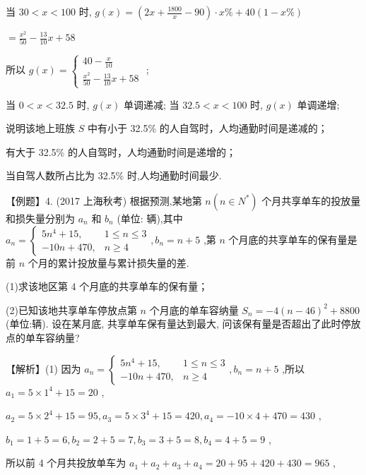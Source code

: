 \documentclass[10pt]{article}
\begin{document}
当 \({30} < x < {100}\) 时, \(g\left( x\right)  = \left( {{2x} + \frac{1800}{x} - {90}}\right)  \cdot  x\%  + {40}\left( {1 - x\% }\right)\)

\(= \frac{{x}^{2}}{50} - \frac{13}{10}x + {58}\)

所以 \(g\left( x\right)  = \left\{  \begin{array}{l} {40} - \frac{x}{10} \\  \frac{{x}^{2}}{50} - \frac{13}{10}x + {58} \end{array}\right.\) ;

当 \(0 < x < {32.5}\) 时, \(g\left( x\right)\) 单调递减; 当 \({32.5} < x < {100}\) 时, \(g\left( x\right)\) 单调递增;

说明该地上班族 \(S\) 中有小于 32.5\% 的人自驾时，人均通勤时间是递减的；

有大于 32.5\% 的人自驾时，人均通勤时间是递增的；

当自驾人数所占比为 32.5\% 时,人均通勤时间最少.

【例题】4. (2017 上海秋考) 根据预测,某地第 \(n\left( {n \in  {N}^{ * }}\right)\) 个月共享单车的投放量和损失量分别为 \({a}_{n}\) 和 \({b}_{n}\) (单位: 辆),其中 \({a}_{n} = \left\{  {\begin{array}{ll} 5{n}^{4} + {15}, & 1 \leq  n \leq  3 \\   - {10n} + {470}, & n \geq  4 \end{array},{b}_{n} = n + 5}\right.\) ,第 \(n\) 个月底的共享单车的保有量是前 \(n\) 个月的累计投放量与累计损失量的差.

(1)求该地区第 4 个月底的共享单车的保有量；

(2)已知该地共享单车停放点第 \(n\) 个月底的单车容纳量 \({S}_{n} =  - 4{\left( n - {46}\right) }^{2} + {8800}\) (单位:辆). 设在某月底, 共享单车保有量达到最大, 问该保有量是否超出了此时停放点的单车容纳量?

【解析】(1) 因为 \({a}_{n} = \left\{  {\begin{array}{ll} 5{n}^{4} + {15}, & 1 \leq  n \leq  3 \\   - {10n} + {470}, & n \geq  4 \end{array},{b}_{n} = n + 5}\right.\) ,所以 \({a}_{1} = 5 \times  {1}^{4} + {15} = {20}\) ,

\({a}_{2} = 5 \times  {2}^{4} + {15} = {95},{a}_{3} = 5 \times  {3}^{4} + {15} = {420},{a}_{4} =  - {10} \times  4 + {470} = {430}\) ,

\({b}_{1} = 1 + 5 = 6,{b}_{2} = 2 + 5 = 7,{b}_{3} = 3 + 5 = 8,{b}_{4} = 4 + 5 = 9\) ,

所以前 4 个月共投放单车为 \({a}_{1} + {a}_{2} + {a}_{3} + {a}_{4} = {20} + {95} + {420} + {430} = {965}\) ,
\end{document}
